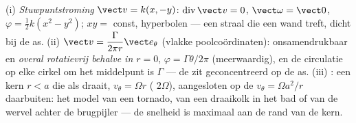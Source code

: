 \begin{example}\label{ex:b2:fluid-kinematics:planeflows}
(i) \emph{Stuwpuntstroming} $\vect v = k(x, -y)$:
$\operatorname{div}\vect v =
0$, $\vect\omega = \vect 0$,
$\varphi = \tfrac12k(x^2 - y^2)$;  $xy = $ const, hyperbolen ---
een straal die een wand treft, dicht bij de as. (ii) \emph{}
$\vect v = \dfrac{\Gamma}{2\pi r}\vect e_\theta$ (vlakke poolcoördinaten):
onsamendrukbaar en \emph{overal rotatievrij behalve in $r = 0$},
$\varphi = \Gamma\theta/2\pi$ (meerwaardig), en de circulatie op elke cirkel
om het middelpunt is $\Gamma$ --- de  zit geconcentreerd op de
as. (iii) \emph{}: een kern $r < a$ die als 
draait, $v_\theta = \Omega r$ ( $2\Omega$), aangesloten op de
 $v_\theta = \Omega a^2/r$ daarbuiten: het model van een tornado,
van een draaikolk in het bad of van de wervel achter de brugpijler --- de
snelheid is maximaal aan de rand van de kern.
\end{example}

